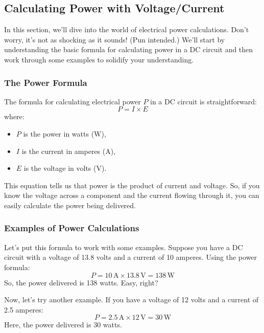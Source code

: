 \subsection{Calculating Power with Voltage/Current}
\label{subsec:calc-power}

In this section, we'll dive into the world of electrical power calculations. Don't worry, it's not as shocking as it sounds! (Pun intended.) We'll start by understanding the basic formula for calculating power in a DC circuit and then work through some examples to solidify your understanding.

\subsubsection*{The Power Formula}
The formula for calculating electrical power \( P \) in a DC circuit is straightforward:
\begin{equation}
    P = I \times E
    \label{eq:power-formula}
\end{equation}
where:
\begin{itemize}[noitemsep]    \item \( P \) is the power in watts (W),
    \item \( I \) is the current in amperes (A),
    \item \( E \) is the voltage in volts (V).
\end{itemize}

This equation tells us that power is the product of current and voltage. So, if you know the voltage across a component and the current flowing through it, you can easily calculate the power being delivered.

\subsubsection*{Examples of Power Calculations}
Let's put this formula to work with some examples. Suppose you have a DC circuit with a voltage of 13.8 volts and a current of 10 amperes. Using the power formula:
\begin{equation}
    P = 10 \, \text{A} \times 13.8 \, \text{V} = 138 \, \text{W}
    \label{eq:power-example1}
\end{equation}
So, the power delivered is 138 watts. Easy, right?

Now, let's try another example. If you have a voltage of 12 volts and a current of 2.5 amperes:
\begin{equation}
    P = 2.5 \, \text{A} \times 12 \, \text{V} = 30 \, \text{W}
    \label{eq:power-example2}
\end{equation}
Here, the power delivered is 30 watts.

